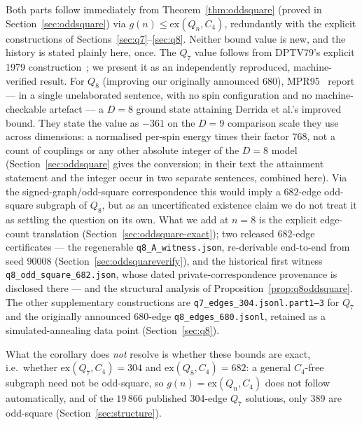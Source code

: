 \documentclass[12pt,a4paper]{article}
\theoremstyle{definition}
\newcommand{\ex}{\mathrm{ex}}
\begin{document}
\noindent Both parts follow immediately from
Theorem~\ref{thm:oddsquare} (proved in Section~\ref{sec:oddsquare}) via
$g(n)\le\ex(Q_n,C_4)$, redundantly with the explicit constructions of
Sections~\ref{sec:q7}--\ref{sec:q8}. Neither bound value is new, and the
history is stated plainly here, once. The $Q_7$ value follows from
DPTV79's explicit 1979 construction~\cite{DPTV79}; we present it as an
independently reproduced, machine-verified result. For $Q_8$ (improving
our originally announced $680$), MPR95~\cite{MPR95} report --- in a
single unelaborated sentence, with no spin configuration and no
machine-checkable artefact --- a $D=8$ ground state attaining Derrida et
al.'s improved bound. They state the value as $-361$ on the $D{=}9$
comparison scale they use across dimensions: a normalised per-spin
energy times their factor $768$, not a count of couplings or any other
absolute integer of the $D{=}8$ model (Section~\ref{sec:oddsquare} gives
the conversion; in their text the attainment statement and the integer
occur in two separate sentences, combined here). Via the
signed-graph/odd-square correspondence this would imply a $682$-edge
odd-square subgraph of $Q_8$, but as an uncertificated existence claim we
do not treat it as settling the question on its own. What we add at
$n=8$ is the explicit edge-count translation
(Section~\ref{sec:oddsquare-exact}); two released $682$-edge
certificates --- the regenerable \texttt{q8\_A\_witness.json},
re-derivable end-to-end from seed $90008$
(Section~\ref{sec:oddsquareverify}), and the historical first witness
\texttt{q8\_odd\_square\_682.json}, whose dated private-correspondence
provenance is disclosed there --- and the structural analysis of
Proposition~\ref{prop:q8oddsquare}. The other supplementary
constructions are \texttt{q7\_edges\_304.jsonl.part1--3} for $Q_7$ and
the originally announced 680-edge \texttt{q8\_edges\_680.jsonl},
retained as a simulated-annealing data point (Section~\ref{sec:q8}).

What the corollary does \emph{not} resolve is whether these bounds are
exact, i.e.\
whether $\ex(Q_7,C_4)=304$ and $\ex(Q_8,C_4)=682$: a general
$C_4$-free subgraph need not be odd-square, so $g(n)=\ex(Q_n,C_4)$ does
not follow automatically, and of the $19\,866$
published 304-edge $Q_7$ solutions, only 389 are odd-square
(Section~\ref{sec:structure}).
\end{document}
